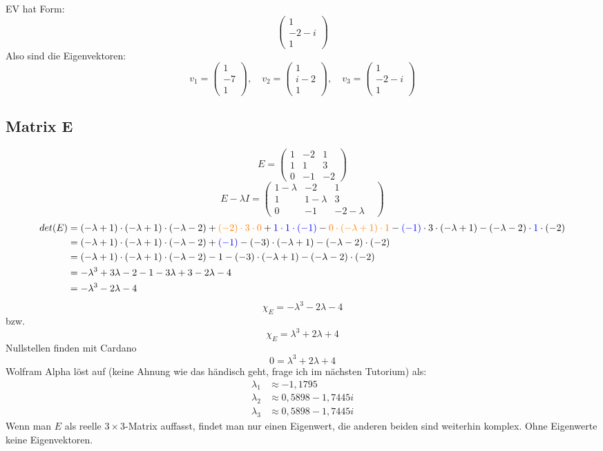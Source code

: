\documentclass{article} %
\newcommand{\blue}[1]{\textcolor{blue}{#1}}
\newcommand{\ora}[1]{\textcolor{orange}{#1}}
\begin{document}
EV hat Form: 
\[
\begin{pmatrix}
1 \\ -2-i\\1
\end{pmatrix}
\]
Also sind die Eigenvektoren:
\[
v_1 = \begin{pmatrix}
1 \\ -7\\1
\end{pmatrix}, \quad v_2 = \begin{pmatrix}
1 \\i-2 \\1
\end{pmatrix}, \quad v_3 =  \begin{pmatrix}
1 \\ -2-i\\1
\end{pmatrix}
\]
\subsection*{Matrix E}
\[
 E = \begin{pmatrix}
 1 &-2&1 \\
 1&1&3\\
 0&-1&-2
 \end{pmatrix}
\]
\[
 E -\lambda I= \begin{pmatrix}
 1-\lambda&-2&1 \\
 1&1-\lambda&3&\\
 0&-1&-2-\lambda
 \end{pmatrix}
\]
\begin{align*}
    det(E) & =  (-\lambda+1)\cdot(-\lambda+1)\cdot(-\lambda-2)+
    \ora{(-2)\cdot3\cdot0}
    + \blue{1\cdot1\cdot(-1)}
    -\ora{0\cdot(-\lambda+1)\cdot1}
    -\blue{(-1)}\cdot3\cdot(-\lambda+1)
    -(-\lambda-2)\cdot\blue{1}\cdot(-2)  \\
& =  (-\lambda+1)\cdot(-\lambda+1)\cdot(-\lambda-2)
    + \blue{(-1)}
    -(-3)\cdot(-\lambda+1)
    -(-\lambda-2)\cdot(-2)  \\
    & = (-\lambda+1)\cdot(-\lambda+1)\cdot(-\lambda-2)
    -1
    -(-3)\cdot(-\lambda+1)
    -(-\lambda-2)\cdot(-2)  \\
     & = -\lambda^3 + 3 \lambda -2
    -1
    -3\lambda+3
    -2\lambda -4\\
    & = -\lambda^3 -2\lambda -4\\
\end{align*}
\[
\chi_E = -\lambda^3 -2\lambda -4
\]
bzw. 
\[
\chi_E = \lambda^3 +2\lambda +4
\]
Nullstellen finden mit Cardano
\[ 0  = \lambda^3 +2\lambda +4\]
Wolfram Alpha löst auf (keine Ahnung wie das händisch geht, frage ich im nächsten Tutorium) als:
\begin{align*}
 \lambda_1 &  \approx -1,1795 \\
  \lambda_2 &  \approx 0,5898 - 1,7445 i \\
   \lambda_3 &  \approx 0,5898 - 1,7445 i
\end{align*}
Wenn man $E$ als reelle $3\times3$-Matrix auffasst, findet man nur einen Eigenwert, die anderen beiden sind weiterhin komplex. Ohne Eigenwerte keine Eigenvektoren. 
\end{document}

